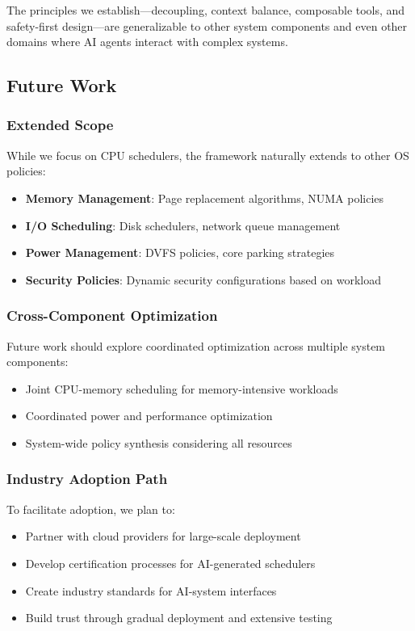 The principles we establish—decoupling, context balance, composable tools, and safety-first design—are generalizable to other system components and even other domains where AI agents interact with complex systems.

\subsection{Future Work}

\subsubsection{Extended Scope}
While we focus on CPU schedulers, the framework naturally extends to other OS policies:
\begin{itemize}
\item \textbf{Memory Management}: Page replacement algorithms, NUMA policies
\item \textbf{I/O Scheduling}: Disk schedulers, network queue management
\item \textbf{Power Management}: DVFS policies, core parking strategies
\item \textbf{Security Policies}: Dynamic security configurations based on workload
\end{itemize}

\subsubsection{Cross-Component Optimization}
Future work should explore coordinated optimization across multiple system components:
\begin{itemize}
\item Joint CPU-memory scheduling for memory-intensive workloads
\item Coordinated power and performance optimization
\item System-wide policy synthesis considering all resources
\end{itemize}

\subsubsection{Industry Adoption Path}
To facilitate adoption, we plan to:
\begin{itemize}
\item Partner with cloud providers for large-scale deployment
\item Develop certification processes for AI-generated schedulers
\item Create industry standards for AI-system interfaces
\item Build trust through gradual deployment and extensive testing
\end{itemize}

